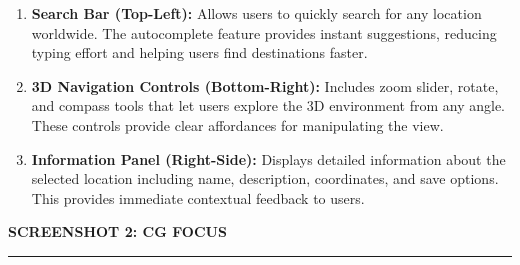 \documentclass[landscape,12pt,a4paper]{article}
\begin{document}
\vspace{0.04cm}


\begin{enumerate}[
    label=\textbf{\arabic*.},
    leftmargin=0.85cm,
    rightmargin=0.45cm,
    nosep,
    itemsep=0.07cm
]

    \item
    \textbf{Search Bar (Top-Left):}
    Allows users to quickly search for any location worldwide.
    The autocomplete feature provides instant suggestions,
    reducing typing effort and helping users find destinations faster.

    \item
    \textbf{3D Navigation Controls (Bottom-Right):}
    Includes zoom slider, rotate, and compass tools that let users
    explore the 3D environment from any angle. These controls
    provide clear affordances for manipulating the view.

    \item
    \textbf{Information Panel (Right-Side):}
    Displays detailed information about the selected location
    including name, description, coordinates, and save options.
    This provides immediate contextual feedback to users.

\end{enumerate}


\newpage

\begin{center}

    {\Large\bfseries\color{titleBlue}
    SCREENSHOT 2: CG FOCUS}

    \vspace{0.06cm}

    \rule{0.80\textwidth}{0.5pt}

    \vspace{0.10cm}

\end{center}
\end{document}
